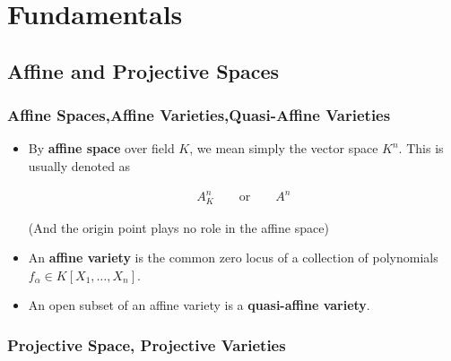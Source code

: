 \documentclass[Total.tex]{subfiles}
\begin{document}
	\tableofcontents
	\chapter{Fundamentals}
	
		\section{Affine and Projective Spaces}
		\subsection{Affine Spaces,Affine Varieties,Quasi-Affine Varieties}
		
			\begin{Def}
				\begin{itemize}
					\item By \textbf{affine space} over field $K$, we mean simply the vector space $K^n$. This is usually denoted as
					
					\begin{gather*}
						A^n_K\qquad\mbox{or}\qquad A^n
					\end{gather*}
					
					(And the origin point plays no role in the affine space)
					
					\item An \textbf{affine variety} is the common zero locus of a collection of polynomials $f_\alpha\in K[X_1,\dots,X_n]$.
					
					\item An open subset of an affine variety is a \textbf{quasi-affine variety}.
				\end{itemize}
			\end{Def}
			
		
		\subsection{Projective Space, Projective Varieties}
\end{document}
